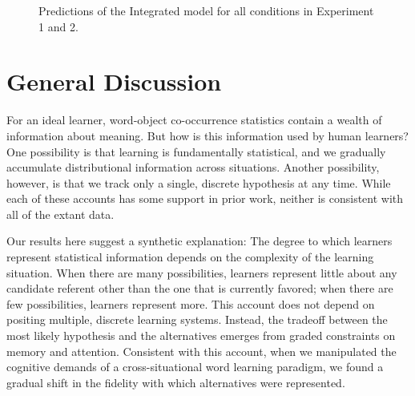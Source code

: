 \documentclass[authoryear,review]{elsarticle}
\begin{document}
 \begin{figure}[tb]
	\caption{\label{fig:model_fit} Predictions of the Integrated model for all conditions in Experiment 1 and 2. }
\end{figure}

\section{General Discussion}

For an ideal learner, word-object co-occurrence statistics contain a wealth of information about meaning. But how is this information used by human learners? One possibility is that learning is fundamentally statistical, and we gradually accumulate distributional information across situations. Another possibility, however, is that we track only a single, discrete hypothesis at any time. While each of these accounts has some support in prior work, neither is consistent with all of the extant data.

Our results here suggest a synthetic explanation: The degree to which learners represent statistical information depends on the complexity of the learning situation. When there are many possibilities, learners represent little about any candidate referent other than the one that is currently favored; when there are few possibilities, learners represent more. This account does not depend on positing multiple, discrete learning systems. Instead, the tradeoff between the most likely hypothesis and the alternatives emerges from graded constraints on memory and attention. Consistent with this account, when we manipulated the cognitive demands of a cross-situational word learning paradigm, we found a gradual shift in the fidelity with which alternatives were represented.
\end{document}
